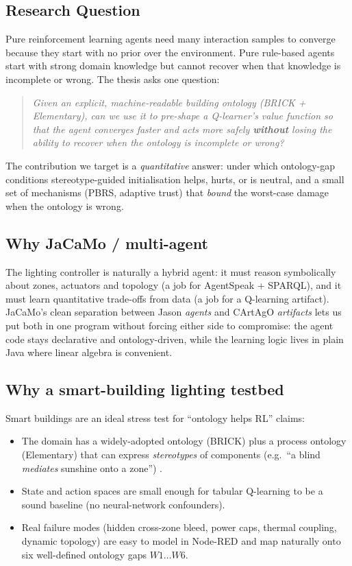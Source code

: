\documentclass[conference]{IEEEtran}
\begin{document}
\subsection{Research Question}
Pure reinforcement learning agents need many interaction samples to converge
because they start with no prior over the environment. Pure rule-based
agents start with strong domain knowledge but cannot recover when that
knowledge is incomplete or wrong. The thesis asks one question:

\begin{quote}
\emph{Given an explicit, machine-readable building ontology
(BRICK + Elementary), can we use it to pre-shape a Q-learner's value
function so that the agent converges faster and acts more safely
\textbf{without} losing the ability to recover when the ontology is
incomplete or wrong?}
\end{quote}

The contribution we target is a \emph{quantitative} answer: under which
ontology-gap conditions stereotype-guided initialisation helps, hurts, or
is neutral, and a small set of mechanisms (PBRS, adaptive trust) that
\emph{bound} the worst-case damage when the ontology is wrong.

\subsection{Why JaCaMo / multi-agent}
The lighting controller is naturally a hybrid agent: it must reason
symbolically about zones, actuators and topology (a job for AgentSpeak +
SPARQL), and it must learn quantitative trade-offs from data (a job for a
Q-learning artifact). JaCaMo's clean separation between Jason
\emph{agents} and CArtAgO \emph{artifacts} lets us put both in one program
without forcing either side to compromise: the agent code stays declarative
and ontology-driven, while the learning logic lives in plain Java where
linear algebra is convenient.

\subsection{Why a smart-building lighting testbed}
Smart buildings are an ideal stress test for ``ontology helps RL'' claims:
\begin{itemize}
  \item The domain has a widely-adopted ontology (BRICK) plus a process
        ontology (Elementary) that can express \emph{stereotypes}
        of components (e.g.\ ``a blind \emph{mediates} sunshine onto a
        zone'') \cite{cecconi2023}.
  \item State and action spaces are small enough for tabular Q-learning
        to be a sound baseline (no neural-network confounders).
  \item Real failure modes (hidden cross-zone bleed, power caps,
        thermal coupling, dynamic topology) are easy to model in
        Node-RED and map naturally onto six well-defined ontology
        gaps $W1\ldots W6$.
\end{itemize}
\end{document}
